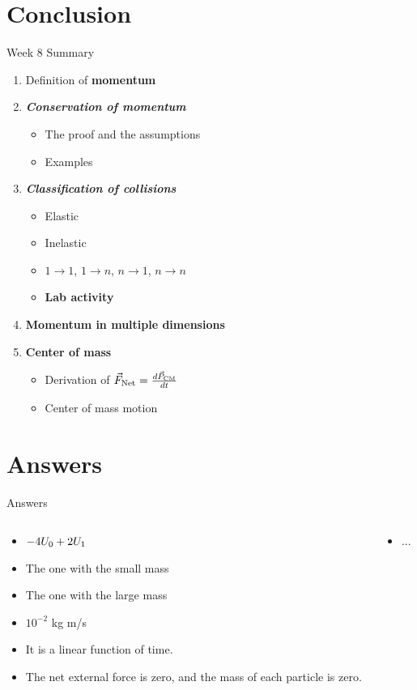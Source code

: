 \documentclass{beamer}
\begin{document}
\section{Conclusion}

\begin{frame}{Week 8 Summary}
\begin{enumerate}
\item Definition of \alert{\textbf{momentum}}
\item \alert{\textbf{\textit{Conservation of momentum}}}
\begin{itemize}
\item The proof and the assumptions
\item Examples
\end{itemize}
\item \alert{\textbf{\textit{Classification of collisions}}}
\begin{itemize}
\item Elastic
\item Inelastic
\item $1 \rightarrow 1$, $1 \rightarrow n$, $n \rightarrow 1$, $n \rightarrow n$
\item \textbf{Lab activity}
\end{itemize}
\item \textbf{Momentum in multiple dimensions}
\item \textbf{Center of mass}
\begin{itemize}
\item Derivation of $\vec{F}_{\rm Net} = \frac{d\vec{P}_{\rm CM}}{dt}$
\item Center of mass motion
\end{itemize}
\end{enumerate}
\end{frame}

\section{Answers}

\begin{frame}{Answers}
\begin{columns}[T]
\begin{column}{0.5\textwidth}
\begin{itemize}
\item $-4U_{\rm 0} + 2U_{\rm 1}$
\item The one with the small mass
\item The one with the large mass
\item $10^{-2}$ kg m/s
\item It is a linear function of time.
\item The net external force is zero, and the mass of each particle is zero.
\end{itemize}
\end{column}
\begin{column}{0.5\textwidth}
\begin{itemize}
\item ...
\end{itemize}
\end{column}
\end{columns}
\end{frame}
\end{document}
